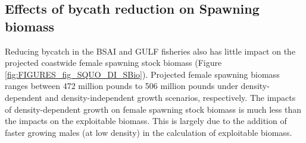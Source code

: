\subsection{Effects of bycath reduction on Spawning biomass} %
\label{sub:effects_of_bycath_reduction_on_spawning_biomass}
Reducing bycatch in the BSAI and GULF fisheries also has little impact on the projected coastwide female spawning stock biomass (Figure \ref{fig:FIGURES_fig_SQUO_DI_SBio}).  Projected female spawning biomass ranges between 472 million pounds to 506 million pounds under density-dependent and density-independent growth scenarios, respectively.  The impacts of density-dependent growth on female spawning stock biomass is much less than the impacts on the exploitable biomass.  This is largely due to the addition of faster growing males (at low density) in the calculation of exploitable biomass.
